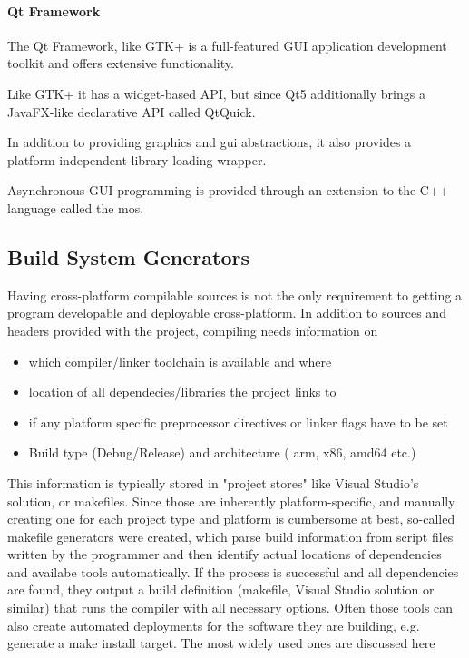 \paragraph{Qt Framework}
The Qt Framework, like GTK+ is a full-featured GUI application development toolkit and offers extensive functionality.

Like GTK+ it has a widget-based API, but since Qt5 additionally brings a JavaFX-like declarative API called QtQuick.

In addition to providing graphics and \gls{gui} abstractions, it also provides a platform-independent library loading wrapper.

Asynchronous GUI programming is provided through an extension to the C++ language called the \gls{mos}.

\subsection{Build System Generators}
\label{sec:resMakefileGen}
Having cross-platform compilable sources is not the only requirement to getting a program developable and deployable cross-platform.
In addition to sources and headers provided with the project, compiling needs information on 
\begin{itemize}
	\item which compiler/linker toolchain is available and where
	\item location of all dependecies/libraries the project links to
	\item if any platform specific preprocessor directives or linker flags have to be set
	\item Build type (Debug/Release) and architecture ( arm, x86, amd64 etc.)
\end{itemize}

This information is typically stored in "project stores" like Visual Studio's solution, or makefiles. Since those are inherently platform-specific, and manually creating one for each project type and platform is cumbersome at best, so-called makefile generators were created, which parse build information from script files written by the programmer and then identify actual locations of dependencies and availabe tools automatically. If the process is successful and all dependencies are found, they output a build definition (makefile, Visual Studio solution or similar) that runs the compiler with all necessary options. Often those tools can also create automated deployments for the software they are building, e.g. generate a make install target. The most widely used ones are discussed here

